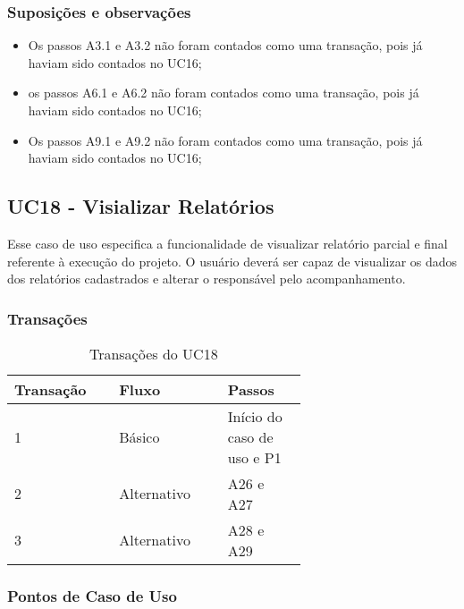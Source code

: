   \subsubsection{Suposições e observações}
  
  \begin{itemize}
   \item Os passos A3.1 e A3.2 não foram contados como uma transação, pois já haviam sido contados no UC16;	
   \item os passos A6.1 e A6.2 não foram contados como uma transação, pois já haviam sido contados no UC16;	
   \item Os passos A9.1 e A9.2 não foram contados como uma transação, pois já haviam sido contados no UC16;
  \end{itemize}
  
  \vfill
  
  
  
  \pagebreak
\subsection{UC18 - Visializar Relatórios}
  
  Esse caso de uso especifica a funcionalidade de visualizar relatório parcial e final referente à execução do projeto.
  O usuário deverá ser capaz de visualizar os dados dos relatórios cadastrados e alterar o responsável pelo acompanhamento.

  \subsubsection{Transações}

  \begin{table*}[!h]
  \centering
  \caption{Transações do UC18}
  \label{uc17_transactions}
    \begin{tabular}{|p{0.20\linewidth}|p{0.25\linewidth}|p{0.20\linewidth}|}
    \hline
    \textbf{Transação} & \textbf{Fluxo} & \textbf{Passos} \\ 
    \hline
    1 & Básico & Início do caso de uso e P1\\
    \hline
    2 & Alternativo & A26 e A27\\
    \hline
    3 & Alternativo & A28 e A29\\
    \hline
    \end{tabular}
  \end{table*}

  \subsubsection{Pontos de Caso de Uso}

